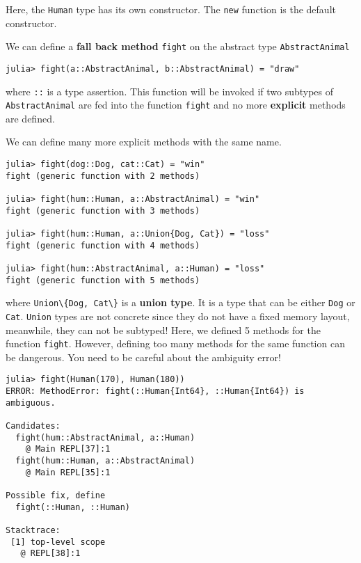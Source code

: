 \documentclass[
  notoc %
]{tufte-book}
\newcommand{\passthrough}[1]{#1}
\begin{document}
Here, the \passthrough{\lstinline!Human!} type has its own constructor.
The \passthrough{\lstinline!new!} function is the default constructor.

We can define a \textbf{fall back method}
\passthrough{\lstinline!fight!} on the abstract type
\passthrough{\lstinline!AbstractAnimal!}

\begin{lstlisting}
julia> fight(a::AbstractAnimal, b::AbstractAnimal) = "draw"
\end{lstlisting}

where \passthrough{\lstinline!::!} is a type assertion. This function
will be invoked if two subtypes of
\passthrough{\lstinline!AbstractAnimal!} are fed into the function
\passthrough{\lstinline!fight!} and no more \textbf{explicit} methods
are defined.

We can define many more explicit methods with the same name.

\begin{lstlisting}
julia> fight(dog::Dog, cat::Cat) = "win"
fight (generic function with 2 methods)

julia> fight(hum::Human, a::AbstractAnimal) = "win"
fight (generic function with 3 methods)

julia> fight(hum::Human, a::Union{Dog, Cat}) = "loss"
fight (generic function with 4 methods)

julia> fight(hum::AbstractAnimal, a::Human) = "loss"
fight (generic function with 5 methods)
\end{lstlisting}

where \passthrough{\lstinline!Union\{Dog, Cat\}!} is a \textbf{union
type}. It is a type that can be either \passthrough{\lstinline!Dog!} or
\passthrough{\lstinline!Cat!}. \passthrough{\lstinline!Union!} types are
not concrete since they do not have a fixed memory layout, meanwhile,
they can not be subtyped! Here, we defined 5 methods for the function
\passthrough{\lstinline!fight!}. However, defining too many methods for
the same function can be dangerous. You need to be careful about the
ambiguity error!

\begin{lstlisting}
julia> fight(Human(170), Human(180))
ERROR: MethodError: fight(::Human{Int64}, ::Human{Int64}) is ambiguous.

Candidates:
  fight(hum::AbstractAnimal, a::Human)
    @ Main REPL[37]:1
  fight(hum::Human, a::AbstractAnimal)
    @ Main REPL[35]:1

Possible fix, define
  fight(::Human, ::Human)

Stacktrace:
 [1] top-level scope
   @ REPL[38]:1
\end{lstlisting}
\end{document}
